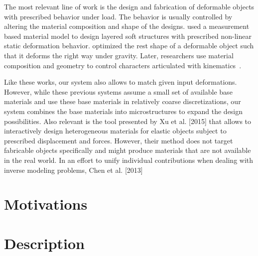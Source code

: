 The most relevant line of work is the design and fabrication of deformable objects with prescribed behavior under load.
The behavior is usually controlled by altering the material composition and shape of the designs.
\citet{Bickel:2010:DAF} used a measurement based material model to design layered soft structures with prescribed non-linear static deformation behavior.
\citet{Chen:2014:ANM} optimized the rest shape of a deformable object such that it deforms the right way under gravity.
Later, researchers use material composition and geometry to control characters 
articulated with kinematics~\citep{Bickel:2012,Skouras13Computational}.

Like these works, our system also allows to match given input deformations.
 However, while these previous systems assume a small set of available base 
 materials and use these base materials in relatively coarse discretizations, 
 our system combines the base materials into microstructures to expand the 
 design possibilities. Also relevant is the tool presented by Xu et al. [2015] 
 that allows to interactively design heterogeneous
materials for elastic objects subject to prescribed displacement and
forces. However, their method does not target fabricable objects
specifically and might produce materials that are not available in
the real world. In an effort to unify individual contributions when
dealing with inverse modeling problems, Chen et al. [2013]

\section{Motivations}


\section{Description}\label{ch1:desc}


\subsection{}


\subsection{}

\section{}


\subsection{}

\subsection{}

\section{}

\subsection{}

\subsection{}
